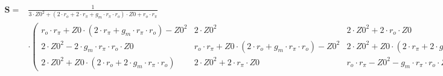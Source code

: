 $\begin{alignedat}{1}\mathbf{S}= & \frac{1}{3\cdot Z0^2+\left(2\cdot
r_o+2\cdot r_{\pi}+g_m\cdot r_{\pi}\cdot r_o\right)\cdot Z0+r_o\cdot
r_{\pi}}\\ & \cdot \left(\begin{smallmatrix} r_o\cdot r_{\pi}+Z0\cdot
\left(2\cdot r_{\pi}+g_m\cdot r_{\pi}\cdot r_o\right)-Z0^2 & 2\cdot
Z0^2 & 2\cdot Z0^2+2\cdot r_o\cdot Z0 \\ 2\cdot Z0^2-2\cdot g_m\cdot
r_{\pi}\cdot r_o\cdot Z0 & r_o\cdot r_{\pi}+Z0\cdot \left(2\cdot
r_o+g_m\cdot r_{\pi}\cdot r_o\right)-Z0^2 & 2\cdot Z0^2+Z0\cdot
\left(2\cdot r_{\pi}+2\cdot g_m\cdot r_{\pi}\cdot r_o\right) \\ 2\cdot
Z0^2+Z0\cdot \left(2\cdot r_o+2\cdot g_m\cdot r_{\pi}\cdot r_o\right)
& 2\cdot Z0^2+2\cdot r_{\pi}\cdot Z0 & r_o\cdot r_{\pi}-Z0^2-g_m\cdot
r_{\pi}\cdot r_o\cdot Z0 \end{smallmatrix}\right)\end{alignedat}$
